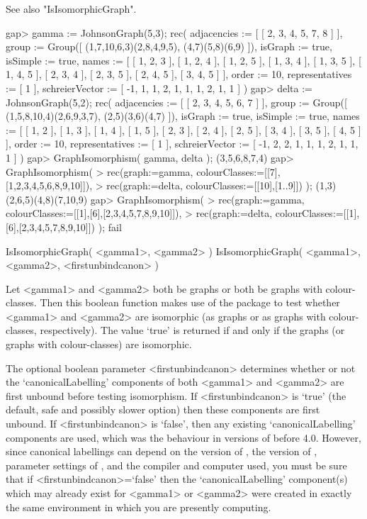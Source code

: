 See also "IsIsomorphicGraph".

\beginexample
gap> gamma := JohnsonGraph(5,3);
rec( adjacencies := [ [ 2, 3, 4, 5, 7, 8 ] ], 
  group := Group([ (1,7,10,6,3)(2,8,4,9,5), (4,7)(5,8)(6,9) ]), 
  isGraph := true, isSimple := true, 
  names := [ [ 1, 2, 3 ], [ 1, 2, 4 ], [ 1, 2, 5 ], [ 1, 3, 4 ], [ 1, 3, 5 ], 
      [ 1, 4, 5 ], [ 2, 3, 4 ], [ 2, 3, 5 ], [ 2, 4, 5 ], [ 3, 4, 5 ] ], 
  order := 10, representatives := [ 1 ], 
  schreierVector := [ -1, 1, 1, 2, 1, 1, 1, 2, 1, 1 ] )
gap> delta := JohnsonGraph(5,2);
rec( adjacencies := [ [ 2, 3, 4, 5, 6, 7 ] ], 
  group := Group([ (1,5,8,10,4)(2,6,9,3,7), (2,5)(3,6)(4,7) ]), 
  isGraph := true, isSimple := true, 
  names := [ [ 1, 2 ], [ 1, 3 ], [ 1, 4 ], [ 1, 5 ], [ 2, 3 ], [ 2, 4 ], 
      [ 2, 5 ], [ 3, 4 ], [ 3, 5 ], [ 4, 5 ] ], order := 10, 
  representatives := [ 1 ], schreierVector := [ -1, 2, 2, 1, 1, 1, 2, 1, 1, 1 
     ] )
gap> GraphIsomorphism( gamma, delta );
(3,5,6,8,7,4)
gap> GraphIsomorphism( 
>       rec(graph:=gamma, colourClasses:=[[7],[1,2,3,4,5,6,8,9,10]]), 
>       rec(graph:=delta, colourClasses:=[[10],[1..9]]) ); 
(1,3)(2,6,5)(4,8)(7,10,9)
gap> GraphIsomorphism( 
>       rec(graph:=gamma, colourClasses:=[[1],[6],[2,3,4,5,7,8,9,10]]), 
>       rec(graph:=delta, colourClasses:=[[1],[6],[2,3,4,5,7,8,9,10]]) ); 
fail
\endexample


\>IsIsomorphicGraph( <gamma1>, <gamma2> )
\>IsIsomorphicGraph( <gamma1>, <gamma2>, <firstunbindcanon> )

Let <gamma1> and <gamma2> both be graphs or both be graphs with
colour-classes.  Then this boolean function makes use of the {\nauty}
package to test whether <gamma1> and <gamma2> are isomorphic (as graphs or
as graphs with colour-classes, respectively). The value `true' is returned
if and only if the graphs (or graphs with colour-classes) are isomorphic.

The optional boolean parameter <firstunbindcanon> determines whether or
not the `canonicalLabelling' components of both <gamma1> and <gamma2>
are first unbound before testing isomorphism.  If <firstunbindcanon>
is `true' (the default, safe and possibly slower option) then these
components are first unbound.  If <firstunbindcanon> is `false', then any
existing `canonicalLabelling' components are used, which was the behaviour
in versions of {\GRAPE} before 4.0.  However, since canonical labellings
can depend on the version of {\nauty}, the version of {\GRAPE}, parameter
settings of {\nauty}, and the compiler and computer used, you must be
sure that if <firstunbindcanon>=`false' then the `canonicalLabelling'
component(s) which may already exist for <gamma1> or <gamma2> were created
in exactly the same environment in which you are presently computing.

